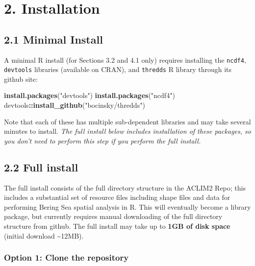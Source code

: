 \documentclass[
]{article}
\newenvironment{Shaded}{\begin{snugshade}}{\end{snugshade}}
\newcommand{\KeywordTok}[1]{\textcolor[rgb]{0.13,0.29,0.53}{\textbf{#1}}}
\newcommand{\NormalTok}[1]{#1}
\newcommand{\OperatorTok}[1]{\textcolor[rgb]{0.81,0.36,0.00}{\textbf{#1}}}
\newcommand{\StringTok}[1]{\textcolor[rgb]{0.31,0.60,0.02}{#1}}
\begin{document}
\hypertarget{installation}{%
\section{2. Installation}\label{installation}}

\hypertarget{minimal-install}{%
\subsection{2.1 Minimal Install}\label{minimal-install}}

A minimal R install (for Sections 3.2 and 4.1 only) requires installing
the \texttt{ncdf4}, \texttt{devtools} libraries (available on CRAN), and
\texttt{thredds} R library through its github site:

\begin{Shaded}
\begin{Highlighting}[]
    \KeywordTok{install.packages}\NormalTok{(}\StringTok{"devtools"}\NormalTok{)}
    \KeywordTok{install.packages}\NormalTok{(}\StringTok{"ncdf4"}\NormalTok{)}
\NormalTok{    devtools}\OperatorTok{::}\KeywordTok{install_github}\NormalTok{(}\StringTok{"bocinsky/thredds"}\NormalTok{)}
\end{Highlighting}
\end{Shaded}

Note that each of these has multiple sub-dependent libraries and may
take several minutes to install. \emph{The full install below includes
installation of these packages, so you don't need to perform this step
if you perform the full install.}

\hypertarget{full-install}{%
\subsection{2.2 Full install}\label{full-install}}

The full install consists of the full directory structure in the ACLIM2
Repo; this includes a substantial set of resource files including shape
files and data for performing Bering Sea spatial analysis in R. This
will eventually become a library package, but currently requires manual
downloading of the full directory structure from github. The full
install may take up to \textbf{1GB of disk space} (initial download
\textasciitilde12MB).

\hypertarget{option-1-clone-the-repository}{%
\subsubsection{Option 1: Clone the
repository}\label{option-1-clone-the-repository}}
\end{document}
